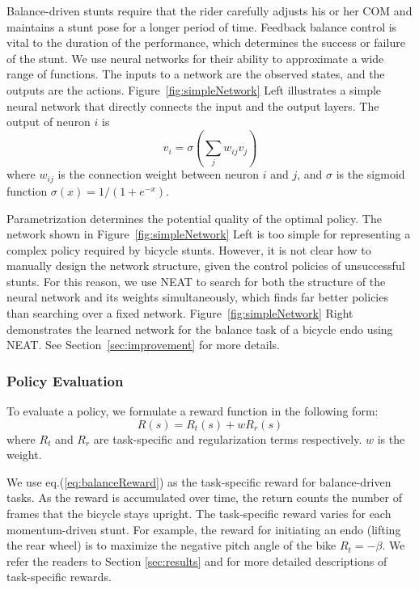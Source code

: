Balance-driven stunts require that the rider carefully adjusts his or her COM and maintains a stunt pose for a longer period of time. Feedback balance control is vital to the duration of the performance, which determines the success or failure of the stunt. We use neural networks for their ability to approximate a wide range of functions. The inputs to a network are the observed states, and the outputs are the actions. Figure~\ref{fig:simpleNetwork} Left illustrates a simple neural network that directly connects the input and the output layers. The output of neuron $i$ is
\begin{displaymath}
v_i=\sigma(\sum_j w_{ij} v_j)
\end{displaymath}
where $w_{ij}$ is the connection weight between neuron $i$ and $j$, and $\sigma$ is the sigmoid function $\sigma(x) = 1/(1+e^{-x})$.

Parametrization determines the potential quality of the optimal policy. The network shown in Figure~\ref{fig:simpleNetwork} Left is too simple for representing a complex policy required by bicycle stunts. However, it is not clear how to manually design the network structure, given the control policies of unsuccessful stunts. For this reason, we use NEAT to search for both the structure of the neural network and its weights simultaneously, which finds far better policies than searching over a fixed network. Figure~\ref{fig:simpleNetwork} Right demonstrates the learned network for the balance task of a bicycle endo using NEAT. See Section~\ref{sec:improvement} for more details.

\subsubsection{Policy Evaluation}
To evaluate a policy, we formulate a reward function in the following form:
\begin{equation}
R(s)=R_t(s)+wR_r(s)
\end{equation}
where $R_t$ and $R_r$ are task-specific and regularization terms respectively. $w$ is the weight.

We use eq.(\ref{eq:balanceReward}) as the task-specific reward for balance-driven tasks. As the reward is accumulated over time, the return counts the number of frames that the bicycle stays upright. The task-specific reward varies for each momentum-driven stunt. For example, the reward for initiating an endo (lifting the rear wheel) is to maximize the negative pitch angle of the bike $R_t=-\beta$. We refer the readers to Section \ref{sec:results} and for more detailed descriptions of task-specific rewards.

